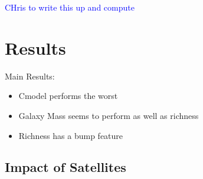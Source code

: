 \documentclass[a4paper,fleqn,usenatbib]{mnras}
\begin{document}
\textcolor{blue}{CHris to write this up and compute}







\section{Results}

Main Results:
\begin{itemize}
    \item Cmodel performs the worst
    \item Galaxy Mass seems to perform as well as richness
    \item Richness has a bump feature
\end{itemize}
    \label{sec:result}
 

\subsection{Impact of Satellites}
\end{document}
